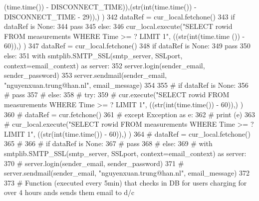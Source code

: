 \begin{DoxyCode}
      (time.time()) - DISCONNECT\_TIME)),(str(int(time.time()) - DISCONNECT\_TIME - 29)),) )
342         dataRef = cur\_local.fetchone()
343         \textcolor{keywordflow}{if} dataRef \textcolor{keywordflow}{is} \textcolor{keywordtype}{None}:
344             \textcolor{keywordflow}{pass}
345         \textcolor{keywordflow}{else}:
346             cur\_local.execute(\textcolor{stringliteral}{"SELECT rowid FROM measurements WHERE Time >= ? LIMIT 1"}, ((str(int(time.time
      ()) - 60)),) )
347             dataRef = cur\_local.fetchone()
348             \textcolor{keywordflow}{if} dataRef \textcolor{keywordflow}{is} \textcolor{keywordtype}{None}:
349                 \textcolor{keywordflow}{pass}
350             \textcolor{keywordflow}{else}:
351                 with smtplib.SMTP\_SSL(smtp\_server, SSLport, context=email\_context) \textcolor{keyword}{as} server:
352                     server.login(sender\_email, sender\_password)                    
353                     server.sendmail(sender\_email, \textcolor{stringliteral}{"nguyenxuan.trung@han.nl"}, email\_message)
354             
355 \textcolor{comment}{#     if dataRef is None:}
356 \textcolor{comment}{#         pass}
357 \textcolor{comment}{#     else:}
358 \textcolor{comment}{#         try:}
359 \textcolor{comment}{#             cur.execute("SELECT rowid FROM measurements WHERE Time >= ? LIMIT 1", ((str(int(time.time())
       - 60)),) )}
360 \textcolor{comment}{#             dataRef = cur.fetchone()}
361 \textcolor{comment}{#         except Exception as e:}
362 \textcolor{comment}{#             print (e)}
363 \textcolor{comment}{#             cur\_local.execute("SELECT rowid FROM measurements WHERE Time >= ? LIMIT 1",
       ((str(int(time.time()) - 60)),) )}
364 \textcolor{comment}{#             dataRef = cur\_local.fetchone()}
365 \textcolor{comment}{#             }
366 \textcolor{comment}{#         if dataRef is None:}
367 \textcolor{comment}{#             pass}
368 \textcolor{comment}{#         else:}
369 \textcolor{comment}{#             with smtplib.SMTP\_SSL(smtp\_server, SSLport, context=email\_context) as server:}
370 \textcolor{comment}{#                 server.login(sender\_email, sender\_password)                    }
371 \textcolor{comment}{#                 server.sendmail(sender\_email, "nguyenxuan.trung@han.nl", email\_message)}
372 
373 \textcolor{comment}{# Function (executed every 5min) that checks in DB for users charging for over 4 hours ands sends them
       email to d/c}
\end{DoxyCode}
\mbox{\label{namespace_s_q_lfunction_a526fa5bc764d15233b0cc1880fc33f83}} 
